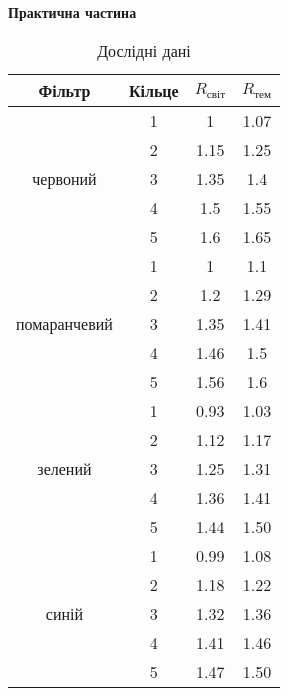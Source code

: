 \begin{center}
    \Large{\textbf{Практична частина}}
\end{center}

\vspace{1mm}

\begin{table}[h]
    \centering
    \begin{tabular}{|c|c|c|c|}
        \hline
        \textbf{Фільтр} & \textbf{Кільце} & \textbf{$R_{світ}$} & \textbf{$R_{тем}$} \\

        \hline
        \multirow{5}{*}{червоний} & 1 & 1 & 1.07 \\
        \cline{2-4}
        & 2 & 1.15 & 1.25 \\
        \cline{2-4}
        & 3 & 1.35 & 1.4 \\
        \cline{2-4}
        & 4 & 1.5 & 1.55 \\
        \cline{2-4}
        & 5 & 1.6 & 1.65 \\
        \hline
        
        \hline
        \multirow{5}{*}{помаранчевий} & 1 & 1 & 1.1 \\
        \cline{2-4}
        & 2 & 1.2 & 1.29  \\
        \cline{2-4}
        & 3 & 1.35 & 1.41 \\
        \cline{2-4}
        & 4 & 1.46 & 1.5  \\
        \cline{2-4}
        & 5 & 1.56 & 1.6  \\ 
        \hline

        \hline
        \multirow{5}{*}{зелений} & 1 & 0.93 & 1.03 \\
        \cline{2-4}
        & 2 & 1.12 & 1.17 \\
        \cline{2-4}
        & 3 & 1.25 & 1.31 \\
        \cline{2-4}
        & 4 & 1.36 & 1.41 \\
        \cline{2-4}
        & 5 & 1.44 & 1.50 \\
        \hline

        \hline
        \multirow{5}{*}{синій} & 1 & 0.99 & 1.08 \\
        \cline{2-4}        
        & 2 & 1.18 & 1.22 \\
        \cline{2-4}
        & 3 & 1.32 & 1.36 \\
        \cline{2-4}
        & 4 & 1.41 & 1.46 \\
        \cline{2-4}
        & 5 & 1.47 & 1.50 \\
        \hline

    \end{tabular}
    \caption{Дослідні дані}
\end{table}


